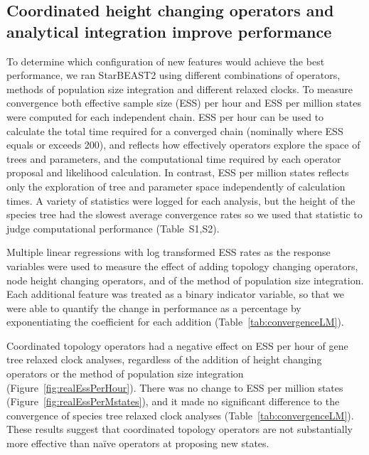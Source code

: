 \documentclass[nogrid]{MBE}%
\begin{document}
\subsection{Coordinated height changing operators and analytical integration improve performance}

To determine which configuration of new features would achieve the best
performance, we ran StarBEAST2 using different combinations of operators,
methods of population size integration and different relaxed clocks. To measure
convergence both effective sample size (ESS) per hour and ESS per million states
were computed for each independent chain. ESS per hour can be used to calculate
the total time required for a converged chain (nominally where ESS equals or
exceeds 200), and reflects how effectively operators explore the space of trees
and parameters, and the computational time required by each operator proposal
and likelihood calculation. In contrast, ESS per million states reflects only
the exploration of tree and parameter space independently of calculation times.
A variety of statistics were logged for each analysis, but the height of the
species tree had the slowest average convergence rates so we used that statistic
to judge computational performance (Table~S1,S2).

Multiple linear regressions with log transformed ESS rates as the response
variables were used to measure the effect of adding topology changing operators,
node height changing operators, and of the method of population size
integration. Each additional feature was treated as a binary indicator variable, so that
we were able to quantify the change in performance as a percentage by
exponentiating the coefficient for each addition
(Table~\ref{tab:convergenceLM}).

Coordinated topology operators had a negative effect on ESS per hour of gene
tree relaxed clock analyses, regardless of the addition of height changing
operators or the method of population size integration
(Figure~\ref{fig:realEssPerHour}). There was no change to ESS per million states
(Figure~\ref{fig:realEssPerMstates}), and it made no significant difference to the
convergence of species tree relaxed clock analyses
(Table~\ref{tab:convergenceLM}). These results suggest that coordinated topology
operators are not substantially more effective than na\"ive operators at
proposing new states.
\end{document}
